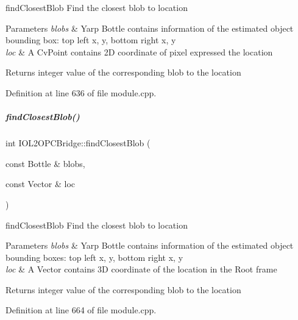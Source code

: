 find\+Closest\+Blob Find the closest blob to location 


\begin{DoxyParams}{Parameters}
{\em blobs} & Yarp Bottle contains information of the estimated object bounding box\+: top left x, y, bottom right x, y \\
\hline
{\em loc} & A Cv\+Point contains 2D coordinate of pixel expressed the location \\
\hline
\end{DoxyParams}
\begin{DoxyReturn}{Returns}
integer value of the corresponding blob to the location 
\end{DoxyReturn}


Definition at line 636 of file module.\+cpp.

\mbox{\label{group__iol2opc_aae4d9ebe5591b73728e105ed0dc859ff}} 
\subparagraph{\texorpdfstring{find\+Closest\+Blob()}{findClosestBlob()}\hspace{0.1cm}{\footnotesize\ttfamily [2/2]}}
{\footnotesize\ttfamily int I\+O\+L2\+O\+P\+C\+Bridge\+::find\+Closest\+Blob (\begin{DoxyParamCaption}\item[{const Bottle \&}]{blobs,  }\item[{const Vector \&}]{loc }\end{DoxyParamCaption})\hspace{0.3cm}{\ttfamily [protected]}}



find\+Closest\+Blob Find the closest blob to location 


\begin{DoxyParams}{Parameters}
{\em blobs} & Yarp Bottle contains information of the estimated object bounding boxes\+: top left x, y, bottom right x, y \\
\hline
{\em loc} & A Vector contains 3D coordinate of the location in the Root frame \\
\hline
\end{DoxyParams}
\begin{DoxyReturn}{Returns}
integer value of the corresponding blob to the location 
\end{DoxyReturn}


Definition at line 664 of file module.\+cpp.

